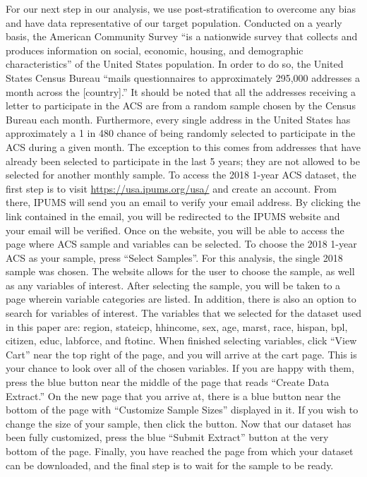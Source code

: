 \documentclass[
]{article}
\begin{document}
For our next step in our analysis, we use post-stratification to overcome any bias and have data representative of our target population. Conducted on a yearly basis, the American Community Survey ``is a nationwide survey that collects and produces information on social, economic, housing, and demographic characteristics'' of the United States population. In order to do so, the United States Census Bureau ``mails questionnaires to approximately 295,000 addresses a month across the {[}country{]}.'' It should be noted that all the addresses receiving a letter to participate in the ACS are from a random sample chosen by the Census Bureau each month. Furthermore, every single address in the United States has approximately a 1 in 480 chance of being randomly selected to participate in the ACS during a given month. The exception to this comes from addresses that have already been selected to participate in the last 5 years; they are not allowed to be selected for another monthly sample.
To access the 2018 1-year ACS dataset, the first step is to visit \url{https://usa.ipums.org/usa/} and create an account. From there, IPUMS will send you an email to verify your email address. By clicking the link contained in the email, you will be redirected to the IPUMS website and your email will be verified. Once on the website, you will be able to access the page where ACS sample and variables can be selected. To choose the 2018 1-year ACS as your sample, press ``Select Samples''. For this analysis, the single 2018 sample was chosen. The website allows for the user to choose the sample, as well as any variables of interest. After selecting the sample, you will be taken to a page wherein variable categories are listed. In addition, there is also an option to search for variables of interest. The variables that we selected for the dataset used in this paper are: region, stateicp, hhincome, sex, age, marst, race, hispan, bpl, citizen, educ, labforce, and ftotinc. When finished selecting variables, click ``View Cart'' near the top right of the page, and you will arrive at the cart page. This is your chance to look over all of the chosen variables. If you are happy with them, press the blue button near the middle of the page that reads ``Create Data Extract.'' On the new page that you arrive at, there is a blue button near the bottom of the page with ``Customize Sample Sizes'' displayed in it. If you wish to change the size of your sample, then click the button. Now that our dataset has been fully customized, press the blue ``Submit Extract'' button at the very bottom of the page. Finally, you have reached the page from which your dataset can be downloaded, and the final step is to wait for the sample to be ready.
\end{document}
